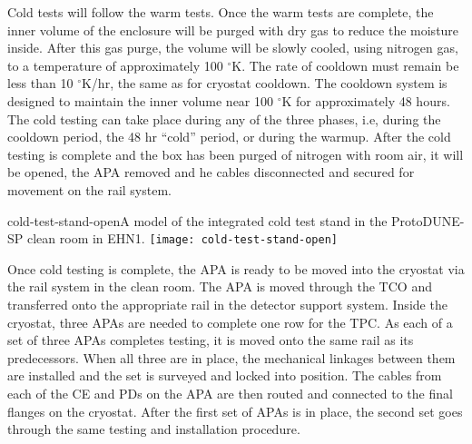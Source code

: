 Cold tests will follow the warm tests. Once the warm tests are complete, the inner volume of the enclosure will be purged with dry gas to reduce the moisture inside.  After this gas purge, the volume will be slowly cooled, using nitrogen gas, to a temperature of approximately 100 $^\circ$K.  The rate of cooldown must remain be less than 10 $^\circ$K/hr, the same as for cryostat cooldown.  The cooldown system is designed to maintain the inner volume near 100 $^\circ$K for approximately 48 hours.  The cold testing can take place during any of the three phases, i.e, during the cooldown period, the 48 hr ``cold'' period, or during the warmup.  After the cold testing is complete and the box has been purged of nitrogen with room air, it will be opened, the APA removed and he cables disconnected and secured for movement on the rail system.   

\begin{cdrfigure}{cold-test-stand-open}{A model of the integrated cold test stand in the ProtoDUNE-SP clean room in EHN1.}
\texttt{[image: cold-test-stand-open]}
\end{cdrfigure}

Once cold testing is complete, the APA is ready to be moved into the cryostat via the rail system in the clean room.  The APA is moved through the TCO and transferred onto the appropriate rail in the detector support system.  Inside the cryostat, three APAs are needed to complete one row for the TPC.  %
As each of a set of three APAs completes testing, it is moved onto the same rail as its predecessors.  When all three are in place, the mechanical linkages between them are installed and the set is surveyed and locked into position. %
The cables from each of the CE and PDs on the APA are then routed and connected to the final flanges on the cryostat.  After the first set of APAs is in place, the second set goes through the same testing and installation procedure.



